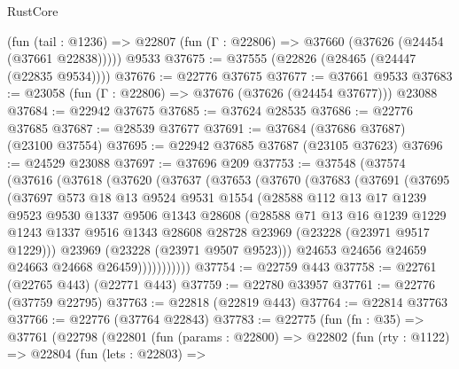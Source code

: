 \begin{lexlean}{RustCore}
\begin{coremodule}
    (fun (tail : @1236) => @22807 (fun (Γ : @22806) => @37660 (@37626 (@24454 (@37661 @22838)))))
    @9533
@37675 := @37555 (@22826 (@28465 (@24447 (@22835 @9534))))
@37676 := @22776 @37675
@37677 := @37661 @9533
@37683 := @23058 (fun (Γ : @22806) => @37676 (@37626 (@24454 @37677))) @23088
@37684 := @22942 @37675
@37685 := @37624 @28535
@37686 := @22776 @37685
@37687 := @28539 @37677
@37691 := @37684 (@37686 @37687) (@23100 @37554)
@37695 := @22942 @37685 @37687 (@23105 @37623)
@37696 := @24529 @23088
@37697 := @37696 @209
@37753 := @37548
    (@37574
      (@37616
        (@37618
          (@37620
            (@37637
              (@37653
                (@37670
                  (@37683
                    (@37691
                      (@37695
                        (@37697
                          @573
                          @18
                          @13
                          @9524
                          @9531
                          @1554
                          (@28588
                            @112
                            @13
                            @17
                            @1239
                            @9523
                            @9530
                            @1337
                            @9506
                            @1343
                            @28608
                            (@28588
                              @71
                              @13
                              @16
                              @1239
                              @1229
                              @1243
                              @1337
                              @9516
                              @1343
                              @28608
                              @28728
                              @23969
                              (@23228 (@23971 @9517 @1229)))
                            @23969
                            (@23228 (@23971 @9507 @9523)))
                          @24653
                          @24656
                          @24659
                          @24663
                          @24668
                          @26459)))))))))))
@37754 := @22759 @443
@37758 := @22761 (@22765 @443) (@22771 @443)
@37759 := @22780 @33957
@37761 := @22776 (@37759 @22795)
@37763 := @22818 (@22819 @443)
@37764 := @22814 @37763
@37766 := @22776 (@37764 @22843)
@37783 := @22775
    (fun (fn : @35) =>
    @37761
      (@22798
        (@22801
          (fun (params : @22800) =>
          @22802
            (fun (rty : @1122) =>
            @22804
              (fun (lets : @22803) =>

\end{coremodule}
\end{lexlean}

